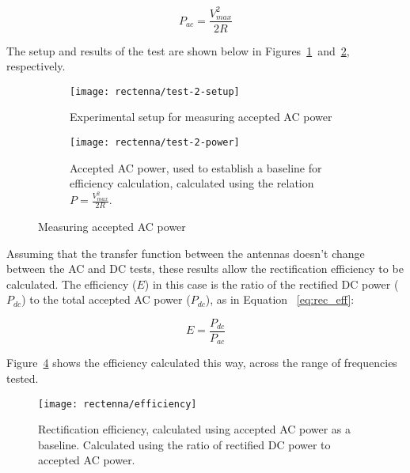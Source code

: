 \begin{equation}
P_{ac} = \frac{V_{max}^2}{2R}
\label{eq:ac_power}
\end{equation}

The setup and results of the test are shown below in Figures~\ref{fig:rectenna-test-2-setup}~and~\ref{fig:rectenna-test-2-power}, respectively.

\begin{figure}[]
    \centering
    \begin{subfigure}{.85\textwidth}
        \centering
        \texttt{[image: rectenna/test-2-setup]}
        \caption{Experimental setup for measuring accepted AC power}
        \label{fig:rectenna-test-2-setup}
    \end{subfigure}
		\par\bigskip
    \begin{subfigure}{.85\textwidth}
        \centering
        \texttt{[image: rectenna/test-2-power]}
        \caption[Accepted AC power]{Accepted AC power, used to establish a baseline for efficiency calculation, calculated using the relation $P = \frac{V_{max}^2}{2R}$.}
        \label{fig:rectenna-test-2-power}
    \end{subfigure}
    \caption[Measuring accepted AC power]{Measuring accepted AC power}
    \label{fig:rectenna-test-2}
\end{figure}

Assuming that the transfer function between the antennas doesn't change between the AC and DC tests, these results allow the rectification efficiency to be calculated. The efficiency ($E$) in this case is the ratio of the rectified DC power ($P_{dc}$) to the total accepted AC power ($P_{dc}$), as in Equation ~\ref{eq:rec_eff}:

\begin{equation}
E = \frac{P_{dc}}{P_{ac}}
\label{eq:rec_eff}
\end{equation}

Figure~\ref{fig:rectenna-efficiency} shows the efficiency calculated this way, across the range of frequencies tested.

\begin{figure}[]
\centering
\texttt{[image: rectenna/efficiency]}
    \caption[Rectification efficiency]{Rectification efficiency, calculated using accepted AC power as a baseline. Calculated using the ratio of rectified DC power to accepted AC power.}
    \label{fig:rectenna-efficiency}
\end{figure}

